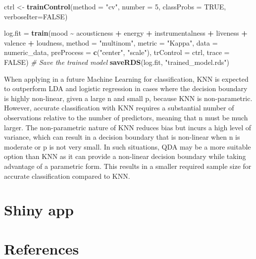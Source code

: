 \documentclass[11pt,]{article}
\newenvironment{Shaded}{\begin{snugshade}}{\end{snugshade}}
\newcommand{\AttributeTok}[1]{\textcolor[rgb]{0.13,0.29,0.53}{#1}}
\newcommand{\CommentTok}[1]{\textcolor[rgb]{0.56,0.35,0.01}{\textit{#1}}}
\newcommand{\ConstantTok}[1]{\textcolor[rgb]{0.56,0.35,0.01}{#1}}
\newcommand{\DecValTok}[1]{\textcolor[rgb]{0.00,0.00,0.81}{#1}}
\newcommand{\FunctionTok}[1]{\textcolor[rgb]{0.13,0.29,0.53}{\textbf{#1}}}
\newcommand{\NormalTok}[1]{#1}
\newcommand{\OtherTok}[1]{\textcolor[rgb]{0.56,0.35,0.01}{#1}}
\newcommand{\SpecialCharTok}[1]{\textcolor[rgb]{0.81,0.36,0.00}{\textbf{#1}}}
\newcommand{\StringTok}[1]{\textcolor[rgb]{0.31,0.60,0.02}{#1}}
\begin{document}
\begin{Shaded}
\begin{Highlighting}[]
\NormalTok{ctrl }\OtherTok{\textless{}{-}} \FunctionTok{trainControl}\NormalTok{(}\AttributeTok{method =} \StringTok{"cv"}\NormalTok{, }\AttributeTok{number =} \DecValTok{5}\NormalTok{,}
                     \AttributeTok{classProbs =} \ConstantTok{TRUE}\NormalTok{, }
                     \AttributeTok{verboseIter=}\ConstantTok{FALSE}\NormalTok{)}

\NormalTok{log.fit }\OtherTok{=} \FunctionTok{train}\NormalTok{(mood }\SpecialCharTok{\textasciitilde{}}\NormalTok{ acousticness }\SpecialCharTok{+}\NormalTok{ energy }\SpecialCharTok{+}\NormalTok{ instrumentalness }\SpecialCharTok{+}\NormalTok{ liveness }\SpecialCharTok{+}\NormalTok{ valence }\SpecialCharTok{+}\NormalTok{ loudness, }
               \AttributeTok{method =} \StringTok{"multinom"}\NormalTok{,}
               \AttributeTok{metric =} \StringTok{"Kappa"}\NormalTok{,}
               \AttributeTok{data =}\NormalTok{ numeric\_data,}
               \AttributeTok{preProcess =} \FunctionTok{c}\NormalTok{(}\StringTok{"center"}\NormalTok{, }\StringTok{"scale"}\NormalTok{),}
               \AttributeTok{trControl =}\NormalTok{ ctrl,}
               \AttributeTok{trace =} \ConstantTok{FALSE}\NormalTok{)}
\CommentTok{\# Save the trained model}
\FunctionTok{saveRDS}\NormalTok{(log.fit, }\StringTok{"trained\_model.rds"}\NormalTok{)}
\end{Highlighting}
\end{Shaded}

When applying in a future Machine Learning for classification, KNN is
expected to outperform LDA and logistic regression in cases where the
decision boundary is highly non-linear, given a large n and small p,
because KNN is non-parametric. However, accurate classification with KNN
requires a substantial number of observations relative to the number of
predictors, meaning that n must be much larger. The non-parametric
nature of KNN reduces bias but incurs a high level of variance, which
can result in a decision boundary that is non-linear when n is moderate
or p is not very small. In such situations, QDA may be a more suitable
option than KNN as it can provide a non-linear decision boundary while
taking advantage of a parametric form. This results in a smaller
required sample size for accurate classification compared to KNN.

\hypertarget{shiny-app}{%
\section{Shiny app}\label{shiny-app}}

\hypertarget{references}{%
\section{References}\label{references}}

\setlength{\parindent}{-0.2in}
\setlength{\leftskip}{0.2in}
\setlength{\parskip}{8pt}
\vspace*{-0.2in}

\noindent





\newpage
\singlespacing

\end{document}
